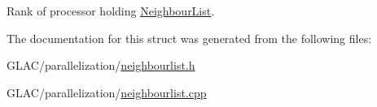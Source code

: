 Rank of processor holding \mbox{\hyperlink{struct_neighbour_list}{Neighbour\+List}}. 



The documentation for this struct was generated from the following files\+:\begin{DoxyCompactItemize}
\item 
G\+L\+A\+C/parallelization/\mbox{\hyperlink{neighbourlist_8h}{neighbourlist.\+h}}\item 
G\+L\+A\+C/parallelization/\mbox{\hyperlink{neighbourlist_8cpp}{neighbourlist.\+cpp}}\end{DoxyCompactItemize}
